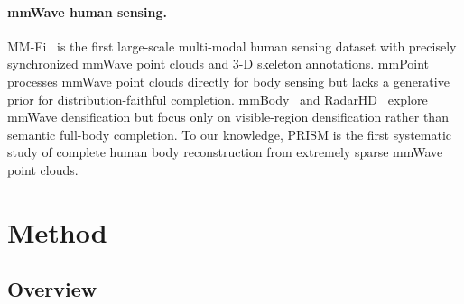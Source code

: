 \documentclass{article}
\begin{document}
\paragraph{mmWave human sensing.}
MM-Fi~\cite{yang2023mmfi} is the first large-scale multi-modal human sensing
dataset with precisely synchronized mmWave point clouds and 3-D skeleton
annotations.
mmPoint~\cite{mmpoint} processes mmWave point clouds directly for body sensing
but lacks a generative prior for distribution-faithful completion.
mmBody~\cite{mmbody} and RadarHD~\cite{radarhd} explore mmWave densification
but focus only on visible-region densification rather than semantic full-body
completion.
To our knowledge, PRISM is the first systematic study of complete human body
reconstruction from extremely sparse mmWave point clouds.

\section{Method}
\label{sec:method}

\subsection{Overview}
\end{document}
